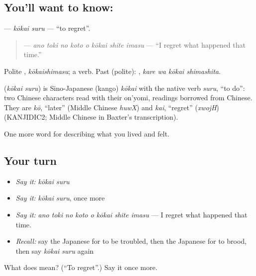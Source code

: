 \subsection*{You'll want to know: }
\textbf{} — \emph{kōkai suru} — \textquotedblleft{}to regret\textquotedblright{}.

\begin{quote}
\textbf{   } — \emph{ano toki no koto o kōkai shite imasu} — \textquotedblleft{}I regret what happened that time.\textquotedblright{}
\end{quote}

Polite \textbf{}, \emph{kōkaishimasu}; a  verb. Past (polite): \textbf{ }, \emph{kare wa kōkai shimashita}.

\begin{cousinweb}
\textbf{} (\emph{kōkai suru}) is Sino-Japanese (kango) \emph{kōkai} with the native verb \emph{suru}, \textquotedblleft{}to do\textquotedblright{}: two Chinese characters read with their on'yomi, readings borrowed from Chinese. They are \emph{kō}, \textquotedblleft{}later\textquotedblright{} (Middle Chinese \emph{huwX}) and \emph{kai}, \textquotedblleft{}regret\textquotedblright{} (\emph{xwojH}) (KANJIDIC2; Middle Chinese in Baxter's transcription).
\end{cousinweb}

\begin{grammarlens}[title={What you've built}]
One more word for describing what you lived and felt.
\end{grammarlens}

\subsection*{Your turn}
\begin{itemize}
\raggedright
  \item \emph{Say it:} \emph{kōkai suru}
  \item \emph{Say it:} \emph{kōkai suru}, once more
  \item \emph{Say it:} \emph{ano toki no koto o kōkai shite imasu} — I regret what happened that time.
  \item \emph{Recall:} say the Japanese for to be troubled, then the Japanese for to brood, then say \emph{kōkai suru} again
\end{itemize}

\begin{tcolorbox}[breakable,colback=teal!4,colframe=teal!35!black,title={Before you move on}]
What does  mean? (\textquotedblleft{}To regret\textquotedblright{}.) Say it once more.
\end{tcolorbox}
